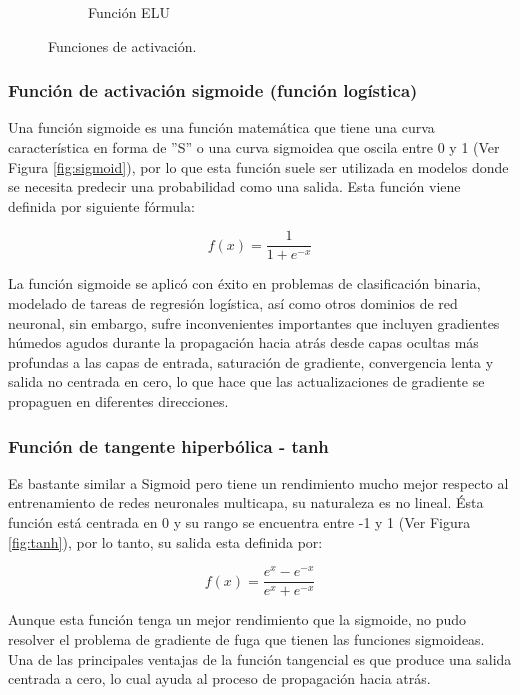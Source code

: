 \begin{figure}
\begin{subfigure}[h]{0.45\textwidth}
            \caption{Funci\'{o}n ELU}
            \label{fig:elu}
        \end{subfigure}
        \caption{Funciones de activaci\'{o}n.}
        
		\label{fig:funciones_activacion}
    \end{figure}
    
\subsubsection{Funci\'{o}n de activaci\'{o}n sigmoide (funci\'{o}n log\'{i}stica)}

Una funci\'{o}n sigmoide es una funci\'{o}n matem\'{a}tica que tiene una curva caracter\'{i}stica en forma de ''S'' o una curva sigmoidea que oscila entre 0 y 1 (Ver Figura \ref{fig:sigmoid}), por lo que esta funci\'{o}n suele ser utilizada en modelos donde se necesita predecir una probabilidad como una salida. Esta funci\'{o}n viene definida por siguiente f\'{o}rmula:

\begin{equation}
f(x) = \frac{1}{1+e^{-x}}
\end{equation}

La funci\'{o}n sigmoide se aplic\'{o} con éxito en problemas de clasificación binaria, modelado de tareas de regresión logística, así como otros dominios de red neuronal, sin embargo, sufre inconvenientes importantes que incluyen gradientes húmedos agudos durante la propagación hacia atrás desde capas ocultas más profundas a las capas de entrada, saturación de gradiente, convergencia lenta y salida no centrada en cero, lo que hace que las actualizaciones de gradiente se propaguen en diferentes direcciones.

\subsubsection{Funci\'{o}n de tangente hiperb\'{o}lica - tanh}

Es bastante similar a Sigmoid pero tiene un rendimiento mucho mejor respecto al entrenamiento de redes neuronales multicapa, su naturaleza es no lineal. \'{E}sta funci\'{o}n est\'{a} centrada en 0 y su rango se encuentra entre -1 y 1 (Ver Figura \ref{fig:tanh}), por lo tanto, su salida esta definida por:

\begin{equation}
f(x)=\frac{e^{x}-e^{-x}}{e^{x}+e^{-x}}
\end{equation}
    
Aunque esta funci\'{o}n tenga un mejor rendimiento que la sigmoide, no pudo resolver el problema de gradiente de fuga que tienen las funciones sigmoideas. Una de las principales ventajas de la funci\'{o}n tangencial es que produce una salida centrada a cero, lo cual ayuda al proceso de propagaci\'{o}n hacia atr\'{a}s.

